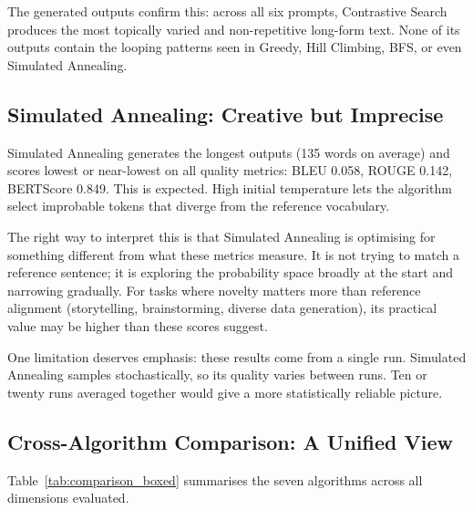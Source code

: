 \documentclass[12pt]{article}
\begin{document}
	The generated outputs confirm this: across all six prompts, Contrastive Search produces the most topically varied and non-repetitive long-form text. None of its outputs contain the looping patterns seen in Greedy, Hill Climbing, BFS, or even Simulated Annealing.
	
	\subsection{Simulated Annealing: Creative but Imprecise}
	\label{sec:sa_discussion}
	
	Simulated Annealing generates the longest outputs (135 words on average) and scores lowest or near-lowest on all quality metrics: BLEU 0.058, ROUGE 0.142, BERTScore 0.849. This is expected. High initial temperature lets the algorithm select improbable tokens that diverge from the reference vocabulary.
	
	The right way to interpret this is that Simulated Annealing is optimising for something different from what these metrics measure. It is not trying to match a reference sentence; it is exploring the probability space broadly at the start and narrowing gradually. For tasks where novelty matters more than reference alignment (storytelling, brainstorming, diverse data generation), its practical value may be higher than these scores suggest.
	
	One limitation deserves emphasis: these results come from a single run. Simulated Annealing samples stochastically, so its quality varies between runs. Ten or twenty runs averaged together would give a more statistically reliable picture.
	
	\subsection{Cross-Algorithm Comparison: A Unified View}
	
	Table~\ref{tab:comparison_boxed} summarises the seven algorithms across all dimensions evaluated.
	
\end{document}
